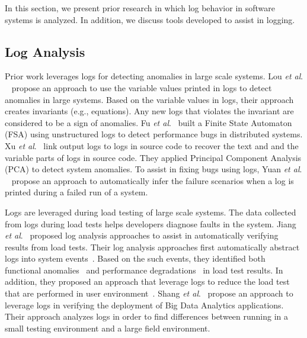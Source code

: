 
In this section, we present prior research in which log behavior in software systems is analyzed. In addition, we discuss tools developed to assist in logging. 

\subsection{Log Analysis}

Prior work leverages logs for detecting anomalies in large scale systems. Lou \textsl{et al}$.$~\cite{JGLouMining} propose an approach to use the variable values printed in logs to detect anomalies in large systems. Based on the variable values in logs, their approach creates invariants (e.g., equations). Any new logs that violates the invariant are considered to be a sign of anomalies. Fu \textsl{et al}$ . $~\cite{QFuanomaly} built a Finite State Automaton (FSA) using unstructured logs to detect performance bugs in distributed systems.  \indent Xu \textsl{et al}$.$~\cite{ConsoleLogs} link output logs to logs in source code to recover the text and and the variable parts of logs in source code. They applied Principal Component Analysis (PCA) to detect system anomalies. To assist in fixing bugs using logs, Yuan \emph{et al$.$}~\cite{Yuan:2010:SED:1736020.1736038} propose an approach to automatically infer the failure scenarios when a log is printed during a failed run of a system.


Logs are leveraged during load testing of large scale systems. The data collected from logs during load tests helps developers diagnose faults in the system. Jiang \textsl{et al$ . $}~\cite{Jiang:2008:AAA:1400155.1400158,JiangICSM2008,JiangICSM20092,Jiang:2010:ICS:1850000.1850068} proposed log analysis approaches to assist in automatically verifying results from load tests. Their log analysis approaches first automatically abstract logs into system events~\cite{Jiang:2008:AAA:1400155.1400158}. Based on the such events, they identified both functional anomalies~\cite{JiangICSM2008} and performance degradations~\cite{JiangICSM20092} in load test results. In addition, they proposed an approach that leverage logs to reduce the load test that are performed in user environment~\cite{Jiang:2010:ICS:1850000.1850068}. Shang\textsl{ et al$.$}~\cite{IanContextinformation} propose an approach to leverage logs in verifying the deployment of Big Data Analytics applications. Their approach analyzes logs in order to find differences between running in a small testing environment and a large field environment.


